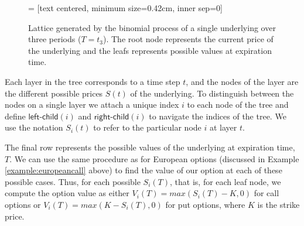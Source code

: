 \begin{figure}
  \centering
   = [text centered, minimum size=0.42cm, inner sep=0]


\vspace{2mm}

\caption{Lattice generated by the binomial process of a single
  underlying over three periods ($T=t_3$). The root
  node represents the current price of the underlying and the leafs
  represents possible values at expiration time.}
\label{fig:binomial-tree}
\end{figure}

Each layer in the tree corresponds to a time step $t$, and the nodes
of the layer are the different possible prices $S(t)$ of the
underlying. To distinguish between the nodes on a single layer we
attach a unique index $i$ to each node of the tree and define
$\mathsf{left\textsf{-}child}(i)$ and
$\mathsf{right\textsf{-}child}(i)$ to navigate the indices of the
tree. We use the notation $S_i(t)$ to refer to the particular node $i$
at layer $t$.

The final row represents the possible values of the underlying at
expiration time, $T$. We can use the same procedure as for European
options (discussed in Example \ref{example:europeancall} above) to
find the value of our option at each of these possible cases. Thus,
for each possible $S_i(T)$, that is, for each leaf node, we compute
the option value as either $V_i(T) = max(S_i(T)-K, 0)$ for call
options or $V_i(T) = max(K-S_i(T),0)$ for put options, where $K$ is
the strike price.

